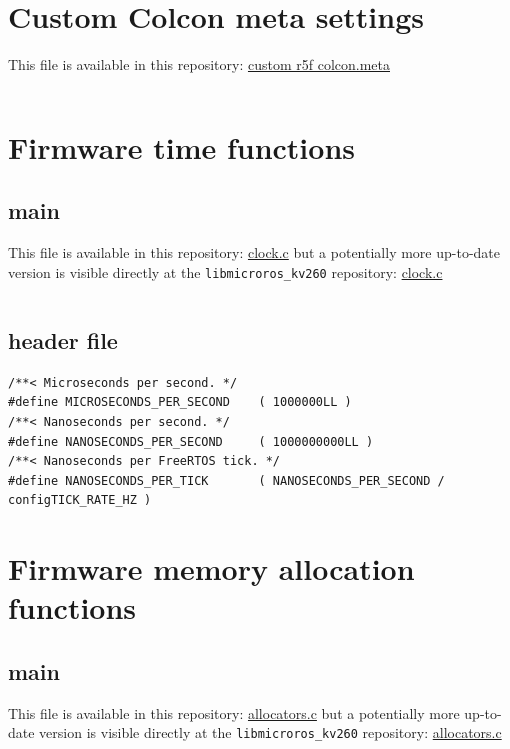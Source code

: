 \documentclass[10pt]{article}
\begin{document}
\pagebreak
\section{Custom Colcon meta settings}
\label{sec:org3415494}
This file is available in this repository: \href{https://gitlab.com/sunoc/xilinx-kria-kv260-documentation/-/blob/b7300116e153f4b5a1542f8804e4646db8030033/src/custom\_r5f\_colcon.meta}{custom r5f colcon.meta}
\inputminted[linenos, frame=single]{yaml}{./src/custom_r5f_colcon.meta}

\pagebreak
\section{Firmware time functions}
\label{sec:org88b570e}

\subsection{main}
\label{sec:org7d56743}
This file is available in this repository: \href{https://gitlab.com/sunoc/xilinx-kria-kv260-documentation/-/blob/b7300116e153f4b5a1542f8804e4646db8030033/src/clock.c}{clock.c}
but a potentially more up-to-date version is visible
directly at the \texttt{libmicroros\_kv260} repository: \href{https://gitlab.com/sunoc/libmicroros\_kv260/-/blob/4867e762f66af7b4647232eb4c0a31106db66e13/src/clock.c}{clock.c}

\inputminted[linenos, frame=single]{c}{./src/clock.c}

\subsection{header file}
\label{sec:org0be9cb4}
\begin{verbatim}
/**< Microseconds per second. */
#define MICROSECONDS_PER_SECOND    ( 1000000LL )  
/**< Nanoseconds per second. */
#define NANOSECONDS_PER_SECOND     ( 1000000000LL ) 
/**< Nanoseconds per FreeRTOS tick. */  
#define NANOSECONDS_PER_TICK       ( NANOSECONDS_PER_SECOND / configTICK_RATE_HZ ) 
\end{verbatim}


\pagebreak
\section{Firmware memory allocation functions}
\label{sec:org66fd245}

\subsection{main}
\label{sec:org400b470}
This file is available in this repository: \href{https://gitlab.com/sunoc/xilinx-kria-kv260-documentation/-/blob/b7300116e153f4b5a1542f8804e4646db8030033/src/allocators.c}{allocators.c}
but a potentially more up-to-date version is visible
directly at the \texttt{libmicroros\_kv260} repository: \href{https://gitlab.com/sunoc/libmicroros\_kv260/-/blob/4867e762f66af7b4647232eb4c0a31106db66e13/src/allocators.c}{allocators.c}
\end{document}
